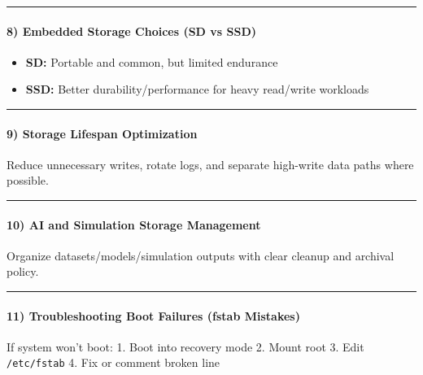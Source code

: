 \documentclass[
  english,
  paper=a4,
  oneside  ,captions=tableheading
]{scrartcl}
\providecommand{\tightlist}{%
  \setlength{\itemsep}{0pt}\setlength{\parskip}{0pt}}
\begin{document}
\begin{center}\rule{0.5\linewidth}{0.5pt}\end{center}

\paragraph{8) Embedded Storage Choices (SD vs
SSD)}\label{embedded-storage-choices-sd-vs-ssd}

\begin{itemize}
\tightlist
\item
  \textbf{SD:} Portable and common, but limited endurance
\item
  \textbf{SSD:} Better durability/performance for heavy read/write
  workloads
\end{itemize}

\begin{center}\rule{0.5\linewidth}{0.5pt}\end{center}

\paragraph{9) Storage Lifespan
Optimization}\label{storage-lifespan-optimization}

Reduce unnecessary writes, rotate logs, and separate high-write data
paths where possible.

\begin{center}\rule{0.5\linewidth}{0.5pt}\end{center}

\paragraph{10) AI and Simulation Storage
Management}\label{ai-and-simulation-storage-management}

Organize datasets/models/simulation outputs with clear cleanup and
archival policy.

\begin{center}\rule{0.5\linewidth}{0.5pt}\end{center}

\paragraph{11) Troubleshooting Boot Failures (fstab
Mistakes)}\label{troubleshooting-boot-failures-fstab-mistakes}

If system won't boot: 1. Boot into recovery mode 2. Mount root 3. Edit
\texttt{/etc/fstab} 4. Fix or comment broken line
\end{document}
